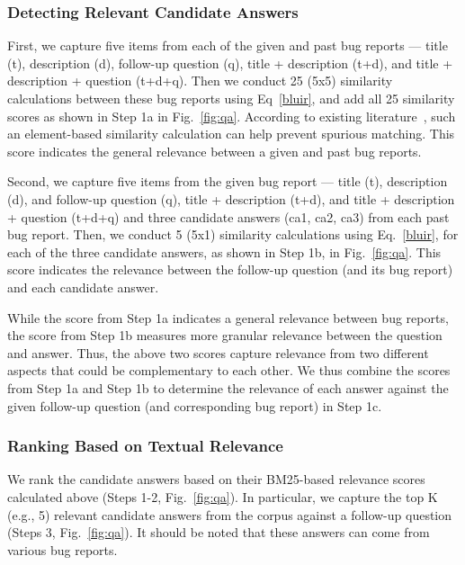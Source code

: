\subsubsection{Detecting Relevant Candidate Answers}
First, we capture five items from each of the given and past bug reports --- title (t), description (d), follow-up question (q), title + description (t+d), and title + description + question (t+d+q). Then we conduct 25 (5x5) similarity calculations between these bug reports using Eq~\ref{bluir}, and add all 25 similarity scores as shown in Step 1a in Fig.~\ref{fig:qa}. According to existing literature~\cite{saha2013improving}, such an element-based similarity calculation can help prevent spurious matching. This score indicates the general relevance between a given and past bug reports.\par
{}
Second, we capture five items from the given bug report --- title (t), description (d), and follow-up question (q), title + description (t+d), and title + description + question (t+d+q) and three candidate answers (ca1, ca2, ca3) from each past bug report. Then, we conduct 5 (5x1) similarity calculations using Eq.~\ref{bluir}, for each of the three candidate answers, as shown in Step 1b, in Fig.~\ref{fig:qa}. This score indicates the relevance between the follow-up question (and its bug report) and each candidate answer.\par

While the score from Step 1a indicates a general relevance between bug reports, the score from Step 1b measures more granular relevance between the question and answer. Thus, the above two scores capture relevance from two different aspects that could be complementary to each other. We thus combine the scores from Step 1a and Step 1b to determine the relevance of each answer against the given follow-up question (and corresponding bug report) in Step 1c.\par

\subsubsection{Ranking Based on Textual Relevance}
We rank the candidate answers based on their BM25-based relevance scores calculated above (Steps 1-2, Fig.~\ref{fig:qa}). In particular, we capture the top K (e.g., 5) relevant candidate answers from the corpus against a follow-up question (Steps 3, Fig.~\ref{fig:qa}). It should be noted that these answers can come from various bug reports.\par

